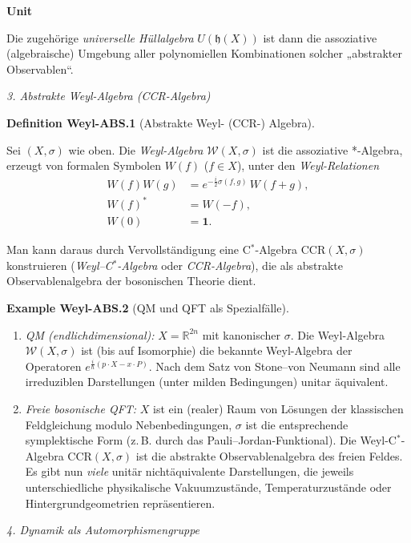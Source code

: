 \documentclass[10pt, letterpaper]{article}
\newcommand{\R}{\mathbb{R}}
\newcommand{\CustomHeading}[3]{%
  \par\medskip\noindent%
  \textbf{#1 #2} \textnormal{(#3)}.\enskip%
}
\newenvironment{DEF}[2]{\begin{unitbox}\CustomHeading{Definition}{#1}{#2}}{\end{unitbox}}
\newenvironment{EXA}[2]{\begin{unitbox}\CustomHeading{Example}{#1}{#2}}{\end{unitbox}}
\newenvironment{unit}[1]
  {\begin{unitbox}\textbf{Unit #1}\par\smallskip}
  {\end{unitbox}}
\begin{document}
\begin{unit}{}
Die zugehörige \emph{universelle Hüllalgebra} \(U(\mathfrak{h}(X))\)
ist dann die assoziative (algebraische) Umgebung aller polynomiellen
Kombinationen solcher „abstrakter Observablen“.

\emph{3. Abstrakte Weyl-Algebra (CCR-Algebra)}

\begin{DEF}{Weyl-ABS.1}{Abstrakte Weyl- (CCR-) Algebra}
Sei \((X,\sigma)\) wie oben.
Die \emph{Weyl-Algebra} \(\mathcal{W}(X,\sigma)\) ist die
assoziative *-Algebra, erzeugt von formalen Symbolen \(W(f)\) (\(f\in X\)),
unter den \emph{Weyl-Relationen}
\begin{align*}
W(f)W(g) &= e^{-\frac{i}{2}\sigma(f,g)}\,W(f+g),\\
W(f)^\ast &= W(-f),\\
W(0) &= \mathbf{1}.
\end{align*}
\end{DEF}

Man kann daraus durch Vervollständigung eine C\(^\ast\)-Algebra
\(\mathrm{CCR}(X,\sigma)\) konstruieren
(\emph{Weyl--C\(^\ast\)-Algebra} oder \emph{CCR-Algebra}),
die als abstrakte Observablenalgebra der bosonischen Theorie dient.

\begin{EXA}{Weyl-ABS.2}{QM und QFT als Spezialfälle}
\begin{enumerate}
\item \emph{QM (endlichdimensional):}
      \(X=\R^{2n}\) mit kanonischer \(\sigma\).
      Die Weyl-Algebra \(\mathcal{W}(X,\sigma)\) ist
      (bis auf Isomorphie) die bekannte Weyl-Algebra der Operatoren
      \(e^{\frac{i}{\hbar}(p\cdot X - x\cdot P)}\).
      Nach dem Satz von Stone--von Neumann sind alle irreduziblen
      Darstellungen (unter milden Bedingungen) unitar äquivalent.
\item \emph{Freie bosonische QFT:}
      \(X\) ist ein (realer) Raum von Lösungen der klassischen Feldgleichung
      modulo Nebenbedingungen, \(\sigma\) ist die entsprechende
      symplektische Form (z.\,B. durch das Pauli--Jordan-Funktional).
      Die Weyl-C\(^\ast\)-Algebra \(\mathrm{CCR}(X,\sigma)\) ist die
      abstrakte Observablenalgebra des freien Feldes.
      Es gibt nun \emph{viele} unitär nichtäquivalente Darstellungen,
      die jeweils unterschiedliche physikalische Vakuumzustände,
      Temperaturzustände oder Hintergrundgeometrien repräsentieren.
\end{enumerate}
\end{EXA}

\emph{4. Dynamik als Automorphismengruppe}


\end{unit}
\end{document}
